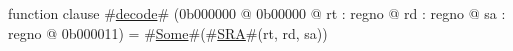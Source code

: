 function clause #\hyperref[zdecode]{decode}# (0b000000 @ 0b00000 @ rt : regno @ rd : regno @ sa : regno @ 0b000011) =
  #\hyperref[zSome]{Some}#(#\hyperref[zSRA]{SRA}#(rt, rd, sa))
